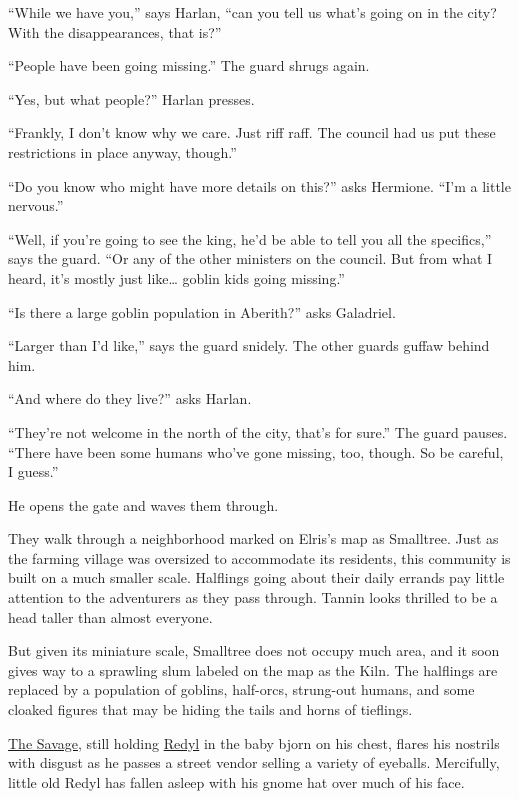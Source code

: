 \documentclass[smalldemyvopaper,11pt,twoside,onecolumn,openright,extrafontsizes]{memoir}
\begin{document}
``While we have you,'' says Harlan, ``can you tell us what's going on in
the city? With the disappearances, that is?''

``People have been going missing.'' The guard shrugs again.

``Yes, but what people?'' Harlan presses.

``Frankly, I don't know why we care. Just riff raff. The council had us
put these restrictions in place anyway, though.''

``Do you know who might have more details on this?'' asks Hermione.
``I'm a little nervous.''

``Well, if you're going to see the king, he'd be able to tell you all
the specifics,'' says the guard. ``Or any of the other ministers on the
council. But from what I heard, it's mostly just like\ldots{} goblin
kids going missing.''

``Is there a large goblin population in Aberith?'' asks Galadriel.

``Larger than I'd like,'' says the guard snidely. The other guards
guffaw behind him.

``And where do they live?'' asks Harlan.

``They're not welcome in the north of the city, that's for sure.'' The
guard pauses. ``There have been some humans who've gone missing, too,
though. So be careful, I guess.''

He opens the gate and waves them through.

They walk through a neighborhood marked on Elris's map as Smalltree.
Just as the farming village was oversized to accommodate its residents,
this community is built on a much smaller scale. Halflings going about
their daily errands pay little attention to the adventurers as they pass
through. Tannin looks thrilled to be a head taller than almost everyone.

But given its miniature scale, Smalltree does not occupy much area, and
it soon gives way to a sprawling slum labeled on the map as the Kiln.
The halflings are replaced by a population of goblins, half-orcs,
strung-out humans, and some cloaked figures that may be hiding the tails
and horns of tieflings.

\href{/characters/the-savage/}{The Savage}, still holding
\href{/characters/redyl/}{Redyl} in the baby bjorn on his chest, flares
his nostrils with disgust as he passes a street vendor selling a variety
of eyeballs. Mercifully, little old Redyl has fallen asleep with his
gnome hat over much of his face.
\end{document}
